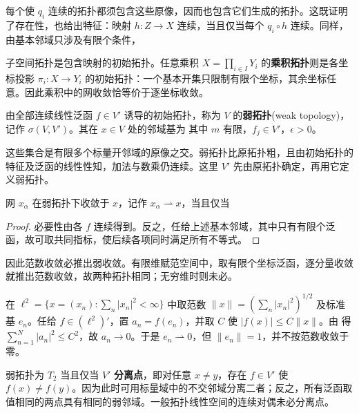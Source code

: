 每个使 $q_i$ 连续的拓扑都须包含这些原像，因而也包含它们生成的拓扑。这既证明了存在性，也给出特征：映射 $h:Z\to X$ 连续，当且仅当每个 $q_i\circ h$ 连续。同样，由基本邻域只涉及有限个条件，

\begin{example}
    子空间拓扑是包含映射的初始拓扑。任意乘积 $X=\prod_{i\in I}Y_i$ 的\textbf{乘积拓扑}则是各坐标投影 $\pi_i:X\to Y_i$ 的初始拓扑：一个基本开集只限制有限个坐标，其余坐标任意。因此乘积中的网收敛恰等价于逐坐标收敛。
\end{example}

\begin{definition}
    由全部连续线性泛函 $f\in V'$ 诱导的初始拓扑，称为 $V$ 的\textbf{弱拓扑}(weak topology)，记作 $\sigma(V,V')$。其在 $x\in V$ 处的邻域基为
    其中 $m$ 有限，$f_j\in V'$，$\epsilon>0$。
\end{definition}

这些集合是有限多个标量开邻域的原像之交。弱拓扑比原拓扑粗，且由初始拓扑的特征及泛函的线性性知，加法与数乘仍连续。这里 $V'$ 先由原拓扑确定，再用它定义弱拓扑。

\begin{theorem}
    网 $x_\alpha$ 在弱拓扑下收敛于 $x$，记作 $x_\alpha\rightharpoonup x$，当且仅当
\end{theorem}
\begin{proof}
    必要性由各 $f$ 连续得到。反之，任给上述基本邻域，其中只有有限个泛函，故可取共同指标，使后续各项同时满足所有不等式。
\end{proof}

因此范数收敛必推出弱收敛。有限维赋范空间中，取有限个坐标泛函，逐分量收敛就推出范数收敛，故两种拓扑相同；无穷维时则未必。

\begin{example}
    在 $\ell^2=\{x=(x_n):\sum_n|x_n|^2<\infty\}$ 中取范数 $\|x\|=(\sum_n|x_n|^2)^{1/2}$ 及标准基 $e_n$。任给 $f\in(\ell^2)'$，置 $a_n=f(e_n)$，并取 $C$ 使 $|f(x)|\leqslant C\|x\|$。由
    得 $\sum_{n=1}^N|a_n|^2\leqslant C^2$，故 $a_n\to0$。于是 $e_n\rightharpoonup0$，但 $\|e_n\|=1$，并不按范数收敛于零。
\end{example}

\begin{remark}
    弱拓扑为 $T_2$ 当且仅当 $V'$ \textbf{分离点}，即对任意 $x\ne y$，存在 $f\in V'$ 使 $f(x)\ne f(y)$。因为此时可用标量域中的不交邻域分离二者；反之，所有泛函取值相同的两点具有相同的弱邻域。一般拓扑线性空间的连续对偶未必分离点。
\end{remark}

